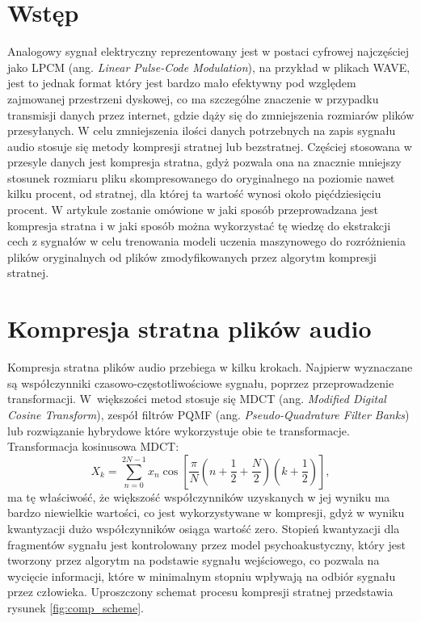 \documentclass[12pt]{oska}
\affiliation{Akademia Górniczo-Hutnicza w Krakowie}
\let\Oldsection\section
\renewcommand{\section}{\FloatBarrier\Oldsection}
\begin{document}
\maketitles

\section{Wstęp}

Analogowy sygnał elektryczny reprezentowany jest w postaci cyfrowej najczęściej
jako LPCM (ang. \textit{Linear Pulse-Code Modulation}), na przykład w plikach
WAVE, jest to jednak format który jest bardzo mało efektywny pod względem
zajmowanej przestrzeni dyskowej, co ma szczególne znaczenie w przypadku
transmisji danych przez internet, gdzie dąży się do zmniejszenia rozmiarów
plików przesyłanych. W celu zmniejszenia ilości danych potrzebnych na zapis
sygnału audio stosuje się metody kompresji stratnej lub bezstratnej. Częściej
stosowana w przesyle danych jest kompresja stratna, gdyż pozwala ona na
znacznie mniejszy stosunek rozmiaru pliku skompresowanego do oryginalnego na
poziomie nawet kilku procent, od stratnej, dla której ta wartość wynosi około
pięćdziesięciu procent. W artykule zostanie omówione w jaki sposób
przeprowadzana jest kompresja stratna i w jaki sposób można wykorzystać tę
wiedzę do ekstrakcji cech z sygnałów w celu trenowania modeli uczenia
maszynowego do rozróżnienia plików oryginalnych od plików zmodyfikowanych przez
algorytm kompresji stratnej.

\section{Kompresja stratna plików audio}

Kompresja stratna plików audio przebiega w kilku krokach. Najpierw wyznaczane
są współczynniki czasowo-częstotliwościowe sygnału, poprzez przeprowadzenie
transformacji. W~większości metod stosuje się MDCT (ang. \textit{Modified
Digital Cosine Transform}), zespół filtrów PQMF (ang. \textit{Pseudo-Quadrature Filter
Banks}) lub rozwiązanie hybrydowe które wykorzystuje obie te
transformacje\cite{Bosi2002IntroductionDA}.
Transformacja kosinusowa MDCT:
\begin{equation}\label{eq:mdct}
  X_k = \sum_{n=0}^{2N-1}x_n\cos\left[\frac{\pi}{N}\left(n+\frac{1}{2}+\frac{N}{2}\right)\left(k+\frac{1}{2}\right)\right],
\end{equation}
ma tę właściwość, że większość współczynników uzyskanych w jej wyniku ma bardzo
niewielkie wartości, co jest wykorzystywane w kompresji, gdyż w wyniku
kwantyzacji dużo współczynników osiąga wartość zero. Stopień kwantyzacji dla
fragmentów sygnału jest kontrolowany przez model psychoakustyczny, który jest
tworzony przez algorytm na podstawie sygnału wejściowego, co pozwala na
wycięcie informacji, które w minimalnym stopniu wpływają na odbiór sygnału
przez człowieka. Uproszczony schemat procesu kompresji stratnej przedstawia
rysunek \ref{fig:comp_scheme}.
\end{document}
